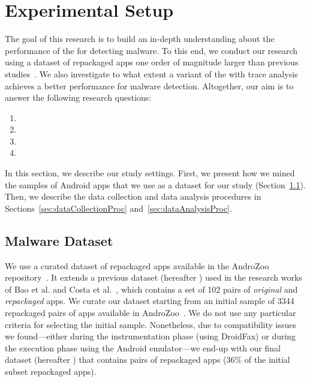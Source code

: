 \section{Experimental Setup}\label{sec:experimentalSetup}

The goal of this research is to build an in-depth understanding about
the performance of the \mas for detecting malware. To this
end, we conduct our research using a dataset of repackaged apps one order of magnitude
larger than previous studies~\cite{DBLP:conf/wcre/BaoLL18,DBLP:journals/jss/CostaMMSSBNR22}.
We also investigate to what
extent a variant of the \mas with trace analysis achieves a better performance
for malware detection. Altogether, our
aim is to answer the following research questions:

\begin{enumerate}[(RQ1)]
\item \rqa
\item \rqb
\item \rqc
\item \rqd  
\end{enumerate}

In this section, we describe our study settings. First, we present how we mined the samples of Android apps that we
use as a dataset for our study (Section~\ref{sec:dataset}).  Then, we describe the data
collection and data analysis procedures in Sections~\ref{sec:dataCollectionProc} and~\ref{sec:dataAnalysisProc}.


\subsection{Malware Dataset}\label{sec:dataset}

We use a curated dataset of \apps repackaged apps available in the AndroZoo repository~\cite{DBLP:conf/msr/AllixBKT16}.
It extends a previous dataset (hereafter \sds) used in the research works of Bao et al. and Costa et al.~\cite{DBLP:conf/wcre/BaoLL18,DBLP:conf/scam/CostaMCMVBC20},
which contains a set of 102 pairs of \emph{original} and \emph{repackaged} apps.
We curate our dataset starting from an initial sample of 3344 repackaged pairs of apps available in AndroZoo~\cite{DBLP:conf/msr/AllixBKT16}.
We do not use any particular criteria for selecting the initial sample.
Nonetheless, due to compatibility issues we found---either during the instrumentation phase (using DroidFax) or during the execution
phase using the Android emulator---we end-up with our final dataset (hereafter \cds) that contains \apps pairs of
repackaged apps (36\% of the initial subset repackaged apps).

